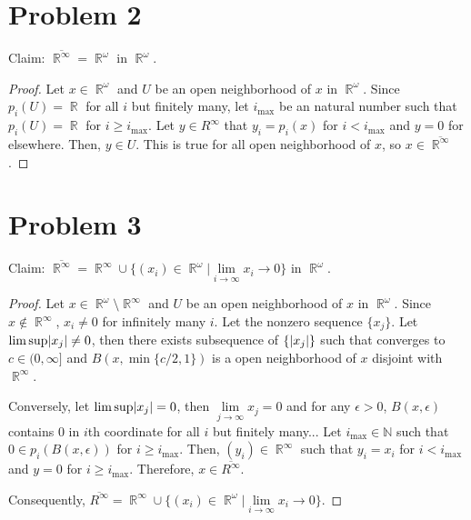 \documentclass{article}
\DeclareMathOperator{\rr}{\mathbb{R}}
\DeclarePairedDelimiter\abs{\lvert}{\rvert}%
\begin{document}
\section*{Problem 2}
Claim: $\overline{\rr^\infty}=\rr^\omega$ in $\rr^\omega$.
\begin{proof}
Let $x\in \rr^\omega$ and $U$ be an open neighborhood of $x$ in $\rr^\omega$. Since $p_i(U)=\rr$ for all $i$ but finitely many, let 
$i_{\max}$ be an natural number such that $p_i(U)= \rr$ for $i\geq i_{\max}$. Let $y\in R^\infty$ that $y_i=p_i(x)$ for $i<i_{\max}$ and 
$y=0$ for elsewhere. Then, $y\in U$. This is true for all open neighborhood of $x$, so $x\in \overline{\rr^\infty}$.
\end{proof}
\section*{Problem 3}
Claim: $\overline{\rr^\infty}=\rr^\infty \cup \{(x_i)\in \rr^\omega|\lim\limits_{i\rightarrow \infty}x_i\rightarrow 0\}$ in $\rr^\omega$.
\begin{proof}
Let $x\in \rr^\omega\setminus \rr^\infty$ and $U$ be an open neighborhood of $x$ in $\rr^\omega$. Since $x\notin \rr^\infty$, $x_i\neq 0$ 
for infinitely many $i$. Let the nonzero sequence $\{x_j\}$. Let $\lim\sup \abs{x_j}\neq 0$, then there exists subsequence of $\{\abs{x_j}\}$
 such that converges to $c\in (0,\infty]$ and $B(x, \min\{c/2, 1\})$ is a open neighborhood of $x$ disjoint with $\rr^\infty$.

Conversely, let $\lim\sup \abs{x_j}= 0$, then $\lim\limits_{j\rightarrow \infty} x_j= 0$ and for any $\epsilon>0$, $B(x, \epsilon)$ contains $0$ in $i$th coordinate for all $i$ but finitely many... Let $i_{\max}\in \mathbb{N}$ such that $0\in p_i(B(x, \epsilon))$ for $i\geq i_{\max}$. Then, $(y_i)\in \rr^\infty$ such that $y_i=x_i$ for $i< i_{\max}$ and $y=0$ for $i\geq i_{\max}$. Therefore, $x\in \overline{R^\infty}$.

Consequently, $\overline{R^\infty}=\rr^\infty \cup \{(x_i)\in \rr^\omega|\lim\limits_{i\rightarrow \infty}x_i\rightarrow 0\}$.
\end{proof}
\end{document}
